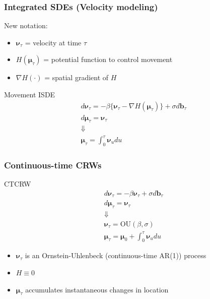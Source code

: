 \documentclass[36pt,handout]{beamer}
\newcommand{\ft}[1]{\frametitle{#1}}
\newcommand{\bb}{\mathbf{b}}
\newcommand{\bmu}{\boldsymbol{\mu}}
\newcommand{\bv}{\boldsymbol{\nu}}
\begin{document}
\begin{frame}
\ft{Integrated SDEs (Velocity modeling)}
New notation:
\begin{itemize}
\item $\bv_\tau$ = velocity at time $\tau$
\item $H(\bmu_\tau)$ = potential function to control movement
\item $\nabla H(\cdot)$ = spatial gradient of $H$
\end{itemize}

\pause

\begin{block}{Movement ISDE}
$$
\begin{aligned}
&d\bv_\tau = -\beta\{\bv_\tau -\nabla H(\bmu_\tau) \} + \sigma d\bb_\tau \\
&d\bmu_\tau = \bv_\tau \\
&\Downarrow \\
&\bmu_\tau = \int_0^\tau \bv_u du
\end{aligned}
$$
\end{block}

\end{frame}


\begin{frame}
\ft{Continuous-time CRWs}
\begin{block}{CTCRW}
$$
\begin{aligned}
&d\bv_\tau = -\beta \bv_\tau + \sigma d\bb_\tau \\
&d\bmu_\tau = \bv_\tau \\
&\Downarrow \\
&\bv_\tau = \mbox{OU}(\beta, \sigma)\\
&\bmu_\tau = \bmu_0 + \int_0^\tau \bv_u du
\end{aligned}
$$
\end{block}

\begin{itemize}
\item $\bv_\tau$ is an Ornstein-Uhlenbeck (continuous-time AR(1)) process
\item $H\equiv 0$
\item $\bmu_\tau$ accumulates instantaneous changes in location
\end{itemize} 

\end{frame}

\end{document}
